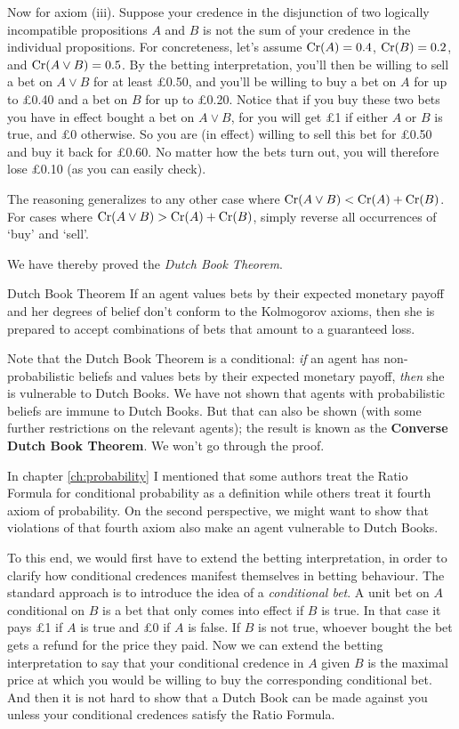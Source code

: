Now for axiom (iii). Suppose your credence in the disjunction of two
logically incompatible propositions $A$ and $B$ is not the sum of your
credence in the individual propositions. For concreteness, let's
assume $\text{Cr}(A) = 0.4$, $\text{Cr}(B) = 0.2$, and $\text{Cr}(A \lor B) = 0.5$. By
the betting interpretation, you'll then be willing to sell a bet on $A
\lor B$ for at least £0.50, and you'll be willing to buy a bet on $A$
for up to £0.40 and a bet on $B$ for up to £0.20. Notice that if you
buy these two bets you have in effect bought a bet on $A \lor B$, for
you will get £1 if either $A$ or $B$ is true, and £0 otherwise. So you
are (in effect) willing to sell this bet for £0.50 and buy it back for
£0.60. No matter how the bets turn out, you will therefore lose £0.10
(as you can easily check).

The reasoning generalizes to any other case where $\text{Cr}(A \lor B) <
\text{Cr}(A) + \text{Cr}(B)$. For cases where $\text{Cr}(A \lor B) > \text{Cr}(A) + \text{Cr}(B)$,
simply reverse all occurrences of `buy' and `sell'.

We have thereby proved the \emph{Dutch Book Theorem}.

\begin{genericthm}{Dutch Book Theorem}
  If an agent values bets by their expected monetary payoff and her
  degrees of belief don't conform to the Kolmogorov axioms, then she
  is prepared to accept combinations of bets that amount to a
  guaranteed loss. 
\end{genericthm}

Note that the Dutch Book Theorem is a conditional: \emph{if} an agent
has non-probabilistic beliefs and values bets by their expected
monetary payoff, \emph{then} she is vulnerable to Dutch Books. We have
not shown that agents with probabilistic beliefs are immune to Dutch
Books. But that can also be shown (with some further
restrictions on the relevant agents); the result is known as the
\textbf{Converse Dutch Book Theorem}. We won't go through the proof.

In chapter \ref{ch:probability} I mentioned that some authors treat
the Ratio Formula for conditional probability as a definition while
others treat it fourth axiom of probability. On the second
perspective, we might want to show that violations of that fourth
axiom also make an agent vulnerable to Dutch Books.

To this end, we would first have to extend the betting interpretation,
in order to clarify how conditional credences manifest themselves in
betting behaviour. The standard approach is to introduce the idea of a
\emph{conditional bet}. A unit bet on $A$ conditional on $B$ is a bet
that only comes into effect if $B$ is true. In that case it pays £1 if
$A$ is true and £0 if $A$ is false. If $B$ is not true, whoever bought
the bet gets a refund for the price they paid. Now we can extend the
betting interpretation to say that your conditional credence in $A$
given $B$ is the maximal price at which you would be willing to buy the
corresponding conditional bet. And then it is not hard to show that a
Dutch Book can be made against you unless your conditional credences
satisfy the Ratio Formula.

